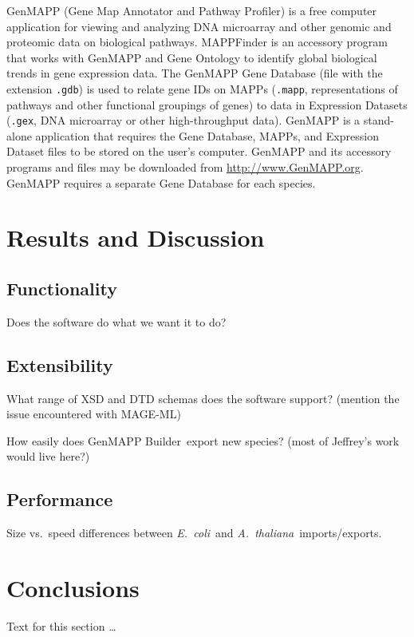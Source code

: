 \documentclass[10pt]{bmc_article}
\newenvironment{bmcformat}{\begin{raggedright}\baselineskip20pt\sloppy\setboolean{publ}{false}}{\end{raggedright}\baselineskip20pt\sloppy}
\def\gmb{GenMAPP Builder}
\def\ecoli{\emph{E.\ coli}}
\def\athaliana{\emph{A.\ thaliana}}
\begin{document}
\begin{bmcformat}
GenMAPP (Gene Map Annotator and Pathway Profiler) is a free computer application for 
viewing and analyzing DNA microarray and other genomic and proteomic data on biological pathways.   MAPPFinder is an accessory program that works with GenMAPP and Gene Ontology to identify global biological trends in gene expression data. The GenMAPP Gene Database (file with the extension \texttt{.gdb}) is used to relate gene IDs on MAPPs (\texttt{.mapp}, representations of pathways and other functional groupings of genes) to data in Expression Datasets (\texttt{.gex}, DNA microarray or other high-throughput data).  GenMAPP is a stand-alone application that requires the Gene Database, MAPPs, and Expression Dataset files to be 
stored on the user's computer. GenMAPP and its accessory programs and files may be downloaded from \url{http://www.GenMAPP.org}.  GenMAPP requires a separate Gene Database for each species.\pb






\section*{Results and Discussion}

\subsection*{Functionality}

Does the software do what we want it to do?\pb

\subsection*{Extensibility}

What range of XSD and DTD schemas does the software support?  (mention the issue encountered with MAGE-ML)\pb

How easily does \gmb\ export new species?  (most of Jeffrey's work would live here?)\pb

\subsection*{Performance}

Size vs.\ speed differences between \ecoli\ and \athaliana\ imports/exports.\pb
    

\section*{Conclusions}
  Text for this section \ldots




\end{bmcformat}
\end{document}
